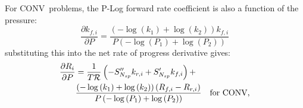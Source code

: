 \documentclass[12pt,number,sort&compress]{elsarticle}
\newcommand{\ns}{N_{sp}}
\newcommand{\conv}{CONV}
\newcommand{\dconv}{\ifmmode\text{for \conv,}\else for \conv,\fi}
\newcommand{\Ru}{\mathcal{R}}
\begin{document}
For \conv~problems, the P-Log forward rate coefficient is also a function of the pressure:
\begin{equation}
 \frac{\partial {k_{f, i}} }{\partial P } = \frac{\left(- \log{\left (k_{1} \right )} + \log{\left (k_{2} \right )}\right) {k_{f, i}}}{P \left(- \log{\left (P_{1} \right )} + \log{\left (P_{2} \right )}\right)}
\end{equation}
substituting this into the net rate of progress derivative gives:
\begin{align}
 \frac{\partial R_{i} }{\partial P } &= \frac{1}{T \Ru} \left(- S^{\prime\prime}_{\ns} {k_{r, i}} + S^{\prime}_{\ns} {k_{f, i}}\right) + & \nonumber \\
				     &  \frac{\left(- \log{\left (k_{1} \right )} + \log{\left (k_{2} \right )}\right) \left({R_{f, i}} - {R_{r, i}}\right)}{P \left(- \log{\left (P_{1} \right )} + \log{\left (P_{2} \right )}\right)} & \text{\dconv}
\end{align}
\end{document}
